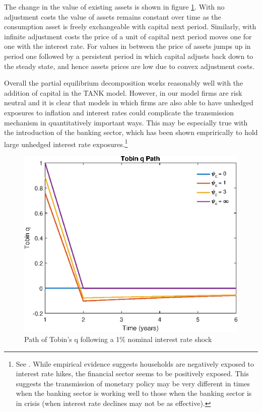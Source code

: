 \documentclass[titlepage]{\econtex}\newcommand{\texname}{ConsumptionHeterogeneity}
\begin{document}


The change in the value of existing assets is shown in figure \ref{fig:PathTobinq}. With no adjustment costs the value of assets remains constant over time as the consumption asset is freely exchangeable with capital next period. Similarly, with infinite adjustment costs the price of a unit of capital next period moves one for one with the interest rate. For values in between the price of assets jumps up in period one followed by a persistent period in which capital adjusts back down to the steady state, and hence assets prices are low due to convex adjustment costs.

Overall the partial equilibrium decomposition works reasonably well with the addition of capital in the TANK model. However, in our model firms are risk neutral and it is clear that models in which firms are also able to have unhedged exposures to inflation and interest rates could complicate the transmission mechanism in quantitatively important ways. This may be especially true with the introduction of the banking sector, which has been shown emprirically to hold large unhedged interest rate exposures.\footnote{See \cite{landier_banks_2013}. While empirical evidence suggests households are negatively exposed to interest rate hikes, the financial sector seems to be positively exposed. This suggests the transmission of monetary policy may be very different in times when the banking sector is working well to those when the banking sector is in crisis (when interest rate declines may not be as effective).}

\begin{figure} 
	\begin{centering}
		\includegraphics[scale=0.7]{../Matlab/DynareCode/Figures/TANK_capital_IRF_q.eps}
		\caption{Path of Tobin's q following a 1\% nominal interest rate shock}
		\label{fig:PathTobinq}
	\end{centering}
\end{figure}
\end{document}
